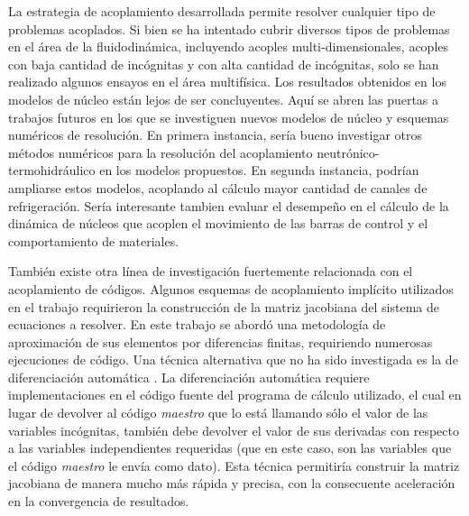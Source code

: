 La estrategia de acoplamiento desarrollada permite resolver cualquier tipo de problemas acoplados.
Si bien se ha intentado cubrir diversos tipos de problemas en el área de la fluidodinámica,
incluyendo acoples multi-dimensionales, acoples con baja cantidad de incógnitas y con alta cantidad de incógnitas,
solo se han realizado algunos ensayos en el área multifísica.
Los resultados obtenidos en los modelos de núcleo están lejos de ser concluyentes.
Aquí se abren las puertas a trabajos futuros en los que se investiguen nuevos modelos de núcleo y esquemas numéricos de resolución.
En primera instancia, sería bueno investigar otros métodos numéricos para la resolución del acoplamiento neutrónico-termohidráulico en los modelos propuestos.
En segunda instancia, podrían ampliarse estos modelos, acoplando al cálculo mayor cantidad de canales de refrigeración.
Sería interesante tambien evaluar el desempeño en el cálculo de la dinámica de núcleos que acoplen el movimiento de las barras de control y el comportamiento de materiales.

También existe otra línea de investigación fuertemente relacionada con el acoplamiento de códigos.
Algunos esquemas de acoplamiento implícito utilizados en el trabajo requirieron la construcción de la matriz jacobiana del sistema de ecuaciones a resolver.
En este trabajo se abordó una metodología de aproximación de sus elementos por diferencias finitas, requiriendo numerosas ejecuciones de código.
Una técnica alternativa que no ha sido investigada es la de diferenciación automática \cite{griewank}.
La diferenciación automática requiere implementaciones en el código fuente del programa de cálculo utilizado,
el cual en lugar de devolver al código \textit{maestro} que lo está llamando sólo el valor de las variables incógnitas,
también debe devolver el valor de sus derivadas con respecto a las variables independientes requeridas
(que en este caso, son las variables que el código \textit{maestro} le envía como dato).
Esta técnica permitiría construir la matriz jacobiana de manera mucho más rápida y precisa,
con la consecuente aceleración en la convergencia de resultados.
